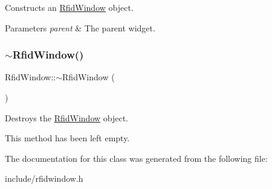 Constructs an \hyperlink{classRfidWindow}{Rfid\+Window} object. 


\begin{DoxyParams}{Parameters}
{\em parent} & The parent widget. \\
\hline
\end{DoxyParams}
\mbox{\label{classRfidWindow_af32c59bb8b410d69cf8047223927ef82}} 
\subsubsection{\texorpdfstring{$\sim$\+Rfid\+Window()}{~RfidWindow()}}
{\footnotesize\ttfamily Rfid\+Window\+::$\sim$\+Rfid\+Window (\begin{DoxyParamCaption}{ }\end{DoxyParamCaption})}



Destroys the \hyperlink{classRfidWindow}{Rfid\+Window} object. 

This method has been left empty. 

The documentation for this class was generated from the following file\+:\begin{DoxyCompactItemize}
\item 
include/rfidwindow.\+h\end{DoxyCompactItemize}
